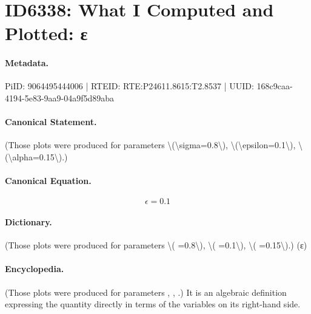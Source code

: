 \section*{ID6338: What I Computed and Plotted: ε}
\paragraph{Metadata.}
PiID: 9064495444006 | RTEID: RTE:P24611.8615:T2.8537 | UUID: 168c9caa-4194-5e83-9aa9-04a9f5d89aba

\paragraph{Canonical Statement.}
(Those plots were produced for parameters \textbackslash{}(\textbackslash{}sigma=0.8\textbackslash{}), \textbackslash{}(\textbackslash{}epsilon=0.1\textbackslash{}), \textbackslash{}(\textbackslash{}alpha=0.15\textbackslash{}).)

\paragraph{Canonical Equation.}
\[
\epsilon=0.1
\]

\paragraph{Dictionary.}
(Those plots were produced for parameters \textbackslash{}( =0.8\textbackslash{}), \textbackslash{}( =0.1\textbackslash{}), \textbackslash{}( =0.15\textbackslash{}).) (ε)

\paragraph{Encyclopedia.}
(Those plots were produced for parameters , , .) It is an algebraic definition expressing the quantity directly in terms of the variables on its right-hand side.
